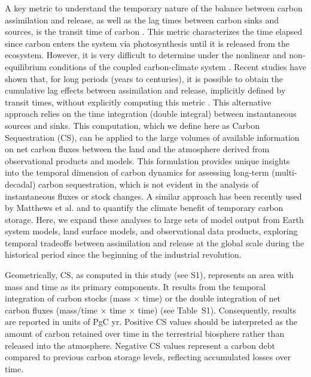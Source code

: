\documentclass[9pt,twocolumn,twoside]{pnas-new}
\begin{document}
A key metric to understand the temporary nature of the balance between carbon assimilation and release, as well as the lag times between carbon sinks and sources, is the transit time of carbon \cite{Thompson1999}. This metric characterizes the time elapsed since carbon enters the system via photosynthesis until it is released from the ecosystem. However, it is very difficult to determine under the nonlinear and non-equilibrium conditions of the coupled carbon-climate system \cite{Rasmussen2016,Metzler2018PNAS}. Recent studies have shown that, for long periods (years to centuries), it is possible to obtain the cumulative lag effects between assimilation and release, implicitly defined by transit times, without explicitly computing this metric \cite{Metzler2024,Sierra2025}. This alternative approach relies on the time integration (double integral) between instantaneous sources and sinks. This computation, which we define here as Carbon Sequestration (CS), can be applied to the large volumes of available information on net carbon fluxes between the land and the atmosphere derived from observational products and models. This formulation provides unique insights into the temporal dimension of carbon dynamics for assessing long-term (multi-decadal) carbon sequestration, which is not evident in the analysis of instantaneous fluxes or stock changes. A similar approach has been recently used by Matthews et al. \cite{Matthews2023} and \cite{Metzler2024} to quantify the climate benefit of temporary carbon storage. Here, we expand these analyses to large sets of model output from Earth system models, land surface models, and observational data products, exploring temporal tradeoffs between assimilation and release at the global scale during the historical period since the beginning of the industrial revolution. 

Geometrically, CS, as computed in this study (see S1), represents an area with mass and time as its primary components. It results from the temporal integration of carbon stocks (mass $\times$ time) or the double integration of net carbon fluxes (mass/time $\times$ time $\times$ time) (see Table~S1). Consequently, results are reported in units of PgC yr. Positive CS values should be interpreted as the amount of carbon retained over time in the terrestrial biosphere rather than released into the atmosphere. Negative CS values represent a carbon debt compared to previous carbon storage levels, reflecting accumulated losses over time.
\end{document}
